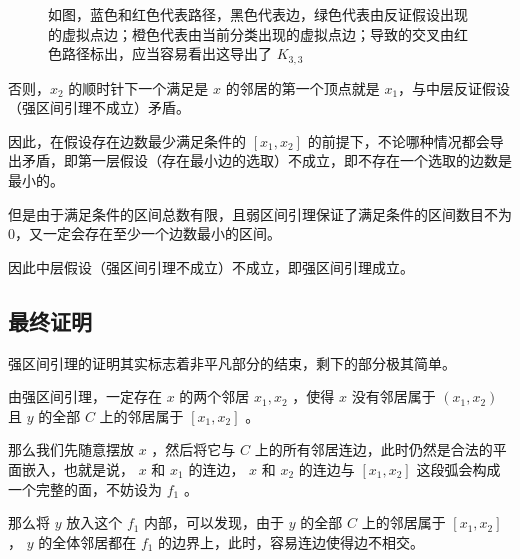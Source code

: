 \documentclass[11pt, a4paper]{ctexart}
\begin{document}
\begin{figure}[H]
    \caption{如图，蓝色和红色代表路径，黑色代表边，绿色代表由反证假设出现的虚拟点边；橙色代表由当前分类出现的虚拟点边；导致的交叉由红色路径标出，应当容易看出这导出了 $K_{3,3}$}
\end{figure}

否则，$x_2$ 的顺时针下一个满足是 $x$ 的邻居的第一个顶点就是 $x_1$，与中层反证假设（强区间引理不成立）矛盾。

因此，在假设存在边数最少满足条件的 $[x_1,x_2]$ 的前提下，不论哪种情况都会导出矛盾，即第一层假设（存在最小边的选取）不成立，即不存在一个选取的边数是最小的。

但是由于满足条件的区间总数有限，且弱区间引理保证了满足条件的区间数目不为 0，又一定会存在至少一个边数最小的区间。

因此中层假设（强区间引理不成立）不成立，即强区间引理成立。

\subsection{最终证明}
强区间引理的证明其实标志着非平凡部分的结束，剩下的部分极其简单。

由强区间引理，一定存在 $x$ 的两个邻居 $x_1,x_2$ ，使得 $x$ 没有邻居属于 $(x_1,x_2)$ 且 $y$ 的全部 $C$ 上的邻居属于 $[x_1,x_2]$ 。

那么我们先随意摆放 $x$ ，然后将它与 $C$ 上的所有邻居连边，此时仍然是合法的平面嵌入，也就是说， $x$ 和 $x_1$ 的连边， $x$ 和 $x_2$ 的连边与 $[x_1,x_2]$ 这段弧会构成一个完整的面，不妨设为 $f_1$ 。

那么将 $y$ 放入这个 $f_1$ 内部，可以发现，由于 $y$ 的全部 $C$ 上的邻居属于 $[x_1,x_2]$ ， $y$ 的全体邻居都在 $f_1$ 的边界上，此时，容易连边使得边不相交。
\end{document}
